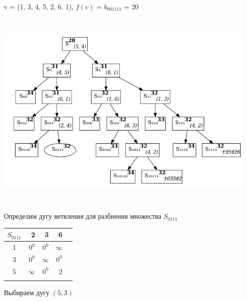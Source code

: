 \documentclass[12pt]{article}
\begin{document}
v = (1, 3, 4, 5, 2, 6, 1), $f(v)$ = $b_{001111}$  = 20\\
\begin{flushleft}
 
\includegraphics[width = 13cm, height = 10cm]{pictures/picture_05.jpg}\\
\end{flushleft}
\vspace{3cm}
\begin{flushleft}
 
Определим дугу ветвления для разбиения множества $S_{0111}$\\
\end{flushleft}

\begin{flushleft}
\begin{tabular}{c||rrr||c}
$S_{0111}$  &2 & 3 &  6 & \\
\hline
\hline
1 &  $0^0$        & $0^0$           & $\infty$ & \\
3 &  $0^0$        & $\infty$    & $0^0$ & \\
5 &  $\infty$        & $0^0$           & 2 & \\
\hline
\hline
 &  &  & &  \\
\end{tabular}
\end{flushleft}

Выбираем дугу $(5,3)$
\end{document}
